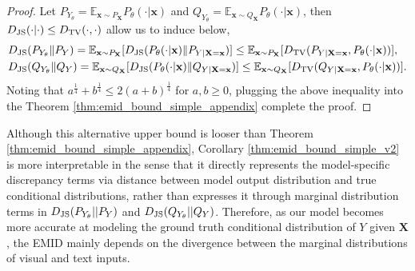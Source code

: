 \begin{proof}
Let $P_{Y_{\theta}}=\mathbb{E}_{\mathbf{x}\sim P_{\mathbf{X}}} P_{{\theta}}(\cdot|\mathbf{x})$ and $Q_{Y_{\theta}}=\mathbb{E}_{\mathbf{x}\sim Q_{\mathbf{X}}} P_{{\theta}}(\cdot|\mathbf{x})$, then $D_{\rm JS}(\cdot|\cdot)\leq D_{\rm TV}(\cdot,\cdot)$ allow us to induce below,
\begin{equation}\label{ineq::delta}
\begin{split}
   &  D_{\rm JS}(P_{Y_{{\theta}}}\|P_{Y}) =  \mathbb{E}_{\mathbf{x}\sim P_{\mathbf{X}}}[D_{\rm JS}(P_{\theta}(\cdot|\mathbf{x})\|P_{Y|\mathbf{X}=\mathbf{x}})] \leq \mathbb{E}_{\mathbf{x}\sim P_{\mathbf{X}}} [D_{\rm TV}(P_{Y|\mathbf{X}=\mathbf{x}},P_{\theta}(\cdot|\mathbf{x}))],
   \\ & D_{\rm JS}(Q_{Y_{{\theta}}}\|Q_{Y}) = \mathbb{E}_{\mathbf{x}\sim Q_{\mathbf{X}}}[D_{\rm JS}(P_{\theta}(\cdot|\mathbf{x})\|Q_{Y|\mathbf{X}=\mathbf{x}})]\leq \mathbb{E}_{\mathbf{x}\sim Q_{\mathbf{X}}} [D_{\rm TV}(Q_{Y|\mathbf{X}=\mathbf{x}},P_{\theta}(\cdot|\mathbf{x}))].
   \end{split}
\end{equation}
Noting that $a^{\frac{1}{4}}+b^{\frac{1}{4}}\leq 2(a+b)^{\frac{1}{4}}$ for $a,b \geq 0$, plugging the above inequality into the Theorem \ref{thm:emid_bound_simple_appendix} complete the proof.
\end{proof}
Although this alternative upper bound is looser than Theorem \ref{thm:emid_bound_simple_appendix}, Corollary \ref{thm:emid_bound_simple_v2} is more interpretable in the sense that it directly represents the model-specific discrepancy terms via distance between model output distribution and true conditional distributions, rather than expresses it through marginal distribution terms in $D_{\rm JS}(P_{Y_{\theta}}||P_{Y})$ and $D_{\rm JS}(Q_{Y_{\theta}}||Q_{Y})$. Therefore, as our model becomes more accurate at modeling the ground truth conditional distribution of $Y$ given $\mathbf{X}$, the EMID mainly depends on the divergence between the marginal distributions of visual and text inputs.
